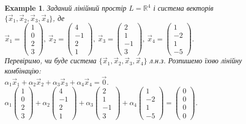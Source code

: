 \documentclass[a4paper, 10pt]{article}
\theoremstyle{theoremdd}
\newtheorem{example}[theorem]{Example}
\begin{document}
	\begin{example}
	Заданий лінійний простір $L = \mathbb{R}^4$ і система векторів $\{\vec{x}_1,\vec{x}_2,\vec{x}_3,\vec{x}_4\}$, де\\
	$\vec{x}_1 =\begin{pmatrix} 1\\ 0\\ 2\\ 3 \end{pmatrix},\ \vec{x}_2 =\begin{pmatrix} 4\\ -1\\ 2\\ 1 \end{pmatrix},\ \vec{x}_3 =\begin{pmatrix} 2\\ 1\\ -1\\ 3 \end{pmatrix},\ \vec{x}_4 =\begin{pmatrix} 1\\ -2\\ 1\\ -5 \end{pmatrix}$.\\
	Перевіримо, чи буде система $\{\vec{x}_1,\vec{x}_2,\vec{x}_3,\vec{x}_4\}$ л.н.з. Розпишемо їхню лінійну комбінацію:\\
	$\alpha_1 \vec{x}_1 + \alpha_2 \vec{x}_2 + \alpha_3 \vec{x}_3 + \alpha_4 \vec{x}_4 = \vec{0}$.\\
	$\alpha_1 \begin{pmatrix} 1\\ 0\\ 2\\ 3 \end{pmatrix} + \alpha_2 \begin{pmatrix} 4\\ -1\\ 2\\ 1 \end{pmatrix} + \alpha_3 \begin{pmatrix} 2\\ 1\\ -1\\ 3 \end{pmatrix} + \alpha_4 \begin{pmatrix} 1\\ -2\\ 1\\ -5 \end{pmatrix} = \begin{pmatrix} 0\\ 0\\ 0\\ 0 \end{pmatrix}$.\\

\end{example}
\end{document}
